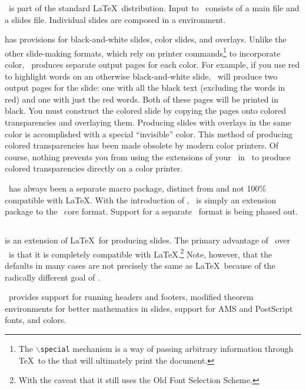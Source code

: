 \SliTeX\ is part of the standard \LaTeX\ distribution.  Input to \SliTeX\
consists of a main file and a slides file.  Individual slides
are composed in a  environment.

 has 
provisions for black-and-white slides, color slides,
and overlays.  Unlike the other slide-making formats, which rely on
\cs{special} printer commands\footnote{The $\backslash$\texttt{special}
mechanism is a way of passing arbitrary information through \TeX\ to the
\dvidriver{} that will ultimately print the document.} to incorporate color, 
\SliTeX\ produces separate output pages for each color.  For example, if you
use red to highlight words on an otherwise black-and-white slide,
\SliTeX\ will produce two output pages for the slide: one with all the
black text (excluding the words in red) and one with just the red
words.  Both of these pages will be printed in black.  You must
construct the colored slide by copying the pages onto colored
transparencies and overlaying them.  Producing slides with overlays
in the same color is accomplished with a special
``invisible'' color.  This method of producing colored transparencies
has been made obsolete by modern color printers.  Of course, nothing
prevents you from using the \cs{special} extensions of your
\dvidriver\ in \SliTeX\ to produce colored transparencies directly on
a color printer.  

\SliTeX\ has always been a separate macro package, distinct from and not
100\% compatible with \LaTeX.  With the introduction of \LaTeXe, \SliTeX\
is simply an extension package to the \LaTeXe\ core format.  Support
for a separate \SliTeX\ format is being phased out.

\subsection{\protect\FoilTeX}

 is an extension of \LaTeX\ for producing slides.  The primary
advantage of \FoilTeX\ over \SliTeX\ is that it is completely compatible
with \LaTeX.\footnote{With the caveat that it still uses the Old Font
Selection Scheme.}   Note, however, that the defaults in many cases 
are not precisely the same as \LaTeX\ because of the radically different
goal of \FoilTeX.

\FoilTeX\ provides support for running headers and footers, modified
theorem environments for better mathematics in slides, support for
AMS and PostScript fonts, and colors.

